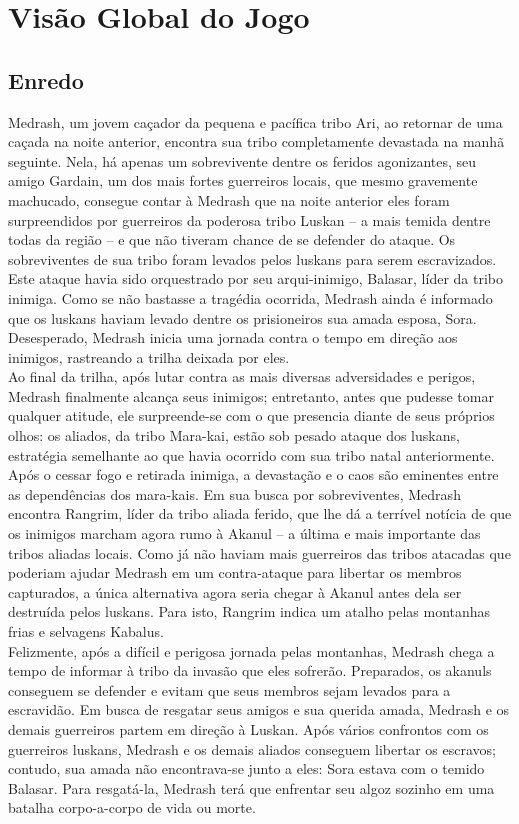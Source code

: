 \section{Visão Global do Jogo}

\subsection{Enredo}
Medrash, um jovem caçador da pequena e pacífica tribo Ari, ao retornar de uma caçada na noite anterior, encontra sua tribo completamente devastada na manhã seguinte. Nela, há apenas um sobrevivente dentre os feridos agonizantes, seu amigo Gardain, um dos mais fortes guerreiros locais, que mesmo gravemente machucado, consegue contar à Medrash que na noite anterior eles foram surpreendidos por guerreiros da poderosa tribo Luskan – a mais temida dentre todas da região – e que não tiveram chance de se defender do ataque. Os sobreviventes de sua tribo foram levados pelos luskans para serem escravizados. Este ataque havia sido orquestrado por seu arqui-inimigo, Balasar, líder da tribo inimiga. Como se não bastasse a tragédia ocorrida, Medrash ainda é informado que os luskans haviam levado dentre os prisioneiros sua amada esposa, Sora.  Desesperado, Medrash inicia uma jornada contra o tempo em direção aos inimigos, rastreando a trilha deixada por eles. \\
Ao final da trilha, após lutar contra as mais diversas adversidades e perigos, Medrash finalmente alcança seus inimigos; entretanto, antes que pudesse tomar qualquer atitude, ele  surpreende-se com o que presencia diante de seus próprios olhos: os aliados, da tribo Mara-kai, estão sob pesado ataque dos luskans, estratégia semelhante ao que havia ocorrido com sua tribo natal anteriormente. Após o cessar fogo e retirada inimiga, a devastação e o caos são eminentes entre as dependências dos mara-kais. Em sua busca por sobreviventes, Medrash encontra Rangrim, líder da tribo aliada ferido, que lhe dá a terrível notícia de que os inimigos marcham agora rumo à Akanul – a última e mais importante das tribos aliadas locais. Como já não haviam mais guerreiros das tribos atacadas que poderiam ajudar Medrash em um contra-ataque para libertar os membros capturados, a única alternativa agora seria chegar à Akanul antes dela ser destruída pelos luskans. Para isto, Rangrim indica um atalho pelas montanhas frias e selvagens Kabalus. \\
Felizmente, após a difícil e perigosa jornada pelas montanhas, Medrash chega a tempo de informar à tribo da invasão que eles sofrerão. Preparados, os akanuls conseguem se defender e evitam que seus membros sejam levados para a escravidão. Em busca de resgatar seus amigos e sua querida amada, Medrash e os demais guerreiros partem em direção à Luskan. Após vários confrontos com os guerreiros luskans, Medrash e os demais aliados conseguem libertar os escravos; contudo, sua amada não encontrava-se junto a eles: Sora estava com o temido Balasar. Para resgatá-la, Medrash terá que enfrentar seu algoz sozinho em uma batalha corpo-a-corpo de vida ou morte.
